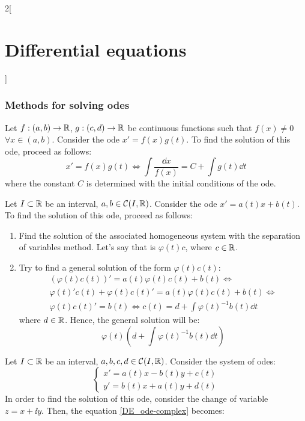 \documentclass[../../../main.tex]{subfiles}
\begin{document}
\begin{multicols}{2}[\section{Differential equations}]
  \subsubsection{Methods for solving odes}
  \begin{method}
    Let $f:(a,b)\rightarrow\mathbb{R}$, $g:(c,d)\rightarrow\mathbb{R}$ be continuous functions such that $f(x)\ne 0$ $\forall x\in (a,b)$. Consider the ode $x'=f(x)g(t)$. To find the solution of this ode, proceed as follows:
    $$x'=f(x)g(t)\iff \int\frac{\dd x}{f(x)}=C+\int g(t)\dd t$$ where the constant $C$ is determined with the initial conditions of the ode.
  \end{method}
  \begin{method}
    Let $I\subset \mathbb{R}$ be an interval, $a,b\in\mathcal{C}(I,\mathbb{R})$. Consider the ode $x'=a(t)x+b(t)$. To find the solution of this ode, proceed as follows:
    \begin{enumerate}
      \item Find the solution of the associated homogeneous system with the separation of variables method. Let's say that is $\varphi(t)c$, where $c\in\mathbb{R}$.
      \item Try to find a general solution of the form $\varphi(t)c(t)$:
            \begin{multline*}
              \left(\varphi(t)c(t)\right)'=a(t)\varphi(t)c(t)+b(t)\iff\\\varphi(t)'c(t)+\varphi(t)c(t)'=a(t)\varphi(t)c(t)+b(t)\iff\\\varphi(t)c(t)'=b(t)\iff c(t)=d+\int\varphi(t)^{-1}b(t)\dd t
            \end{multline*}
            where $d\in\mathbb{R}$. Hence, the general solution will be: $$\varphi(t)\left(d+\int\varphi(t)^{-1}b(t)\dd t\right)$$
    \end{enumerate}
  \end{method}
  \begin{method}
    Let $I\subset \mathbb{R}$ be an interval, $a,b,c,d\in\mathcal{C}(I,\mathbb{R})$. Consider the system of odes:
    \begin{equation}\label{DE_ode-complex}
      \left\{
      \begin{aligned}
        x'=a(t)x-b(t)y+c(t) \\
        y'=b(t)x+a(t)y+d(t)
      \end{aligned}
      \right.
    \end{equation}
    In order to find the solution of this ode, consider the change of variable $z=x+\ii y$. Then, the equation \eqref{DE_ode-complex} becomes:

\end{method}
\end{multicols}
\end{document}
